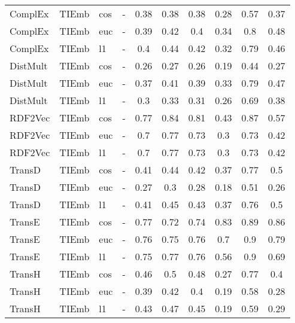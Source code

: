 \begin{longtable}{|llll|ccc|ccc|}
\hline 
ComplEx	&	TIEmb	&	cos	&	-	&	0.38	&	0.38	&	0.38	&	0.28	&	0.57	&	0.37 \\ 
ComplEx	&	TIEmb	&	euc	&	-	&	0.39	&	0.42	&	0.4	&	0.34	&	0.8	&	0.48 \\ 
ComplEx	&	TIEmb	&	l1	&	-	&	0.4	&	0.44	&	0.42	&	0.32	&	0.79	&	0.46 \\ 
DistMult	&	TIEmb	&	cos	&	-	&	0.26	&	0.27	&	0.26	&	0.19	&	0.44	&	0.27 \\ 
DistMult	&	TIEmb	&	euc	&	-	&	0.37	&	0.41	&	0.39	&	0.33	&	0.79	&	0.47 \\ 
DistMult	&	TIEmb	&	l1	&	-	&	0.3	&	0.33	&	0.31	&	0.26	&	0.69	&	0.38 \\ 
RDF2Vec	&	TIEmb	&	cos	&	-	&	0.77	&	0.84	&	0.81	&	0.43	&	0.87	&	0.57 \\ 
RDF2Vec	&	TIEmb	&	euc	&	-	&	0.7	&	0.77	&	0.73	&	0.3	&	0.73	&	0.42 \\ 
RDF2Vec	&	TIEmb	&	l1	&	-	&	0.7	&	0.77	&	0.73	&	0.3	&	0.73	&	0.42 \\ 
TransD	&	TIEmb	&	cos	&	-	&	0.41	&	0.44	&	0.42	&	0.37	&	0.77	&	0.5 \\ 
TransD	&	TIEmb	&	euc	&	-	&	0.27	&	0.3	&	0.28	&	0.18	&	0.51	&	0.26 \\ 
TransD	&	TIEmb	&	l1	&	-	&	0.41	&	0.45	&	0.43	&	0.37	&	0.76	&	0.5 \\ 
TransE	&	TIEmb	&	cos	&	-	&	0.77	&	0.72	&	0.74	&	0.83	&	0.89	&	0.86 \\ 
TransE	&	TIEmb	&	euc	&	-	&	0.76	&	0.75	&	0.76	&	0.7	&	0.9	&	0.79 \\ 
TransE	&	TIEmb	&	l1	&	-	&	0.75	&	0.77	&	0.76	&	0.56	&	0.9	&	0.69 \\ 
TransH	&	TIEmb	&	cos	&	-	&	0.46	&	0.5	&	0.48	&	0.27	&	0.77	&	0.4 \\ 
TransH	&	TIEmb	&	euc	&	-	&	0.39	&	0.42	&	0.4	&	0.19	&	0.58	&	0.28 \\ 
TransH	&	TIEmb	&	l1	&	-	&	0.43	&	0.47	&	0.45	&	0.19	&	0.59	&	0.29 \\ 
\hline
\end{longtable}
